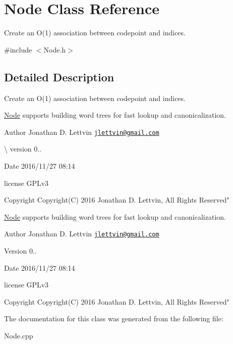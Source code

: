 \hypertarget{class_node}{}\section{Node Class Reference}
\label{class_node}


Create an O(1) association between codepoint and indices.  




{\ttfamily \#include $<$Node.\+h$>$}



\subsection{Detailed Description}
Create an O(1) association between codepoint and indices. 

\hyperlink{class_node}{Node} supports building word trees for fast lookup and canonicalization.

\begin{DoxyAuthor}{Author}
Jonathan D. Lettvin \href{mailto:jlettvin@gmail.com}{\tt jlettvin@gmail.\+com}
\end{DoxyAuthor}
\textbackslash{} version 0..

\begin{DoxyDate}{Date}
2016/11/27 08\+:14
\end{DoxyDate}
license G\+P\+Lv3

\begin{DoxyCopyright}{Copyright}
Copyright(\+C) 2016 Jonathan D. Lettvin, All Rights Reserved"
\end{DoxyCopyright}
\hyperlink{class_node}{Node} supports building word trees for fast lookup and canonicalization.

\begin{DoxyAuthor}{Author}
Jonathan D. Lettvin \href{mailto:jlettvin@gmail.com}{\tt jlettvin@gmail.\+com}
\end{DoxyAuthor}
\begin{DoxyVersion}{Version}
0..
\end{DoxyVersion}
\begin{DoxyDate}{Date}
2016/11/27 08\+:14
\end{DoxyDate}
license G\+P\+Lv3

\begin{DoxyCopyright}{Copyright}
Copyright(\+C) 2016 Jonathan D. Lettvin, All Rights Reserved" 
\end{DoxyCopyright}


The documentation for this class was generated from the following file\+:\begin{DoxyCompactItemize}
\item 
Node.\+cpp\end{DoxyCompactItemize}
